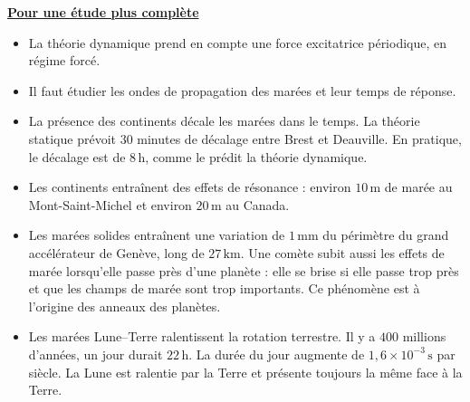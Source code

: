 \documentclass[11pt,a4paper]{article}
\newcommand{\titr}[1]{\par\textbf{\underline{#1}}\par\nopagebreak[3]}
\begin{document}
\titr{Pour une étude plus complète}
\begin{itemize}
\item La théorie dynamique prend en compte une force excitatrice périodique, en régime forcé.
\item Il faut étudier les ondes de propagation des marées et leur temps de réponse.
\item La présence des continents décale les marées dans le temps. La théorie statique prévoit $30$ minutes de décalage entre Brest et Deauville. En pratique, le décalage est de $8\,\mathrm h$, comme le prédit la théorie dynamique.
\item Les continents entraînent des effets de résonance : environ $10\,\mathrm m$ de marée au Mont-Saint-Michel et environ $20\,\mathrm m$ au Canada.
\item Les marées solides entraînent une variation de $1\,\mathrm{mm}$ du périmètre du grand accélérateur de Genève, long de $27\,\mathrm{km}$. Une comète subit aussi les effets de marée lorsqu'elle passe près d'une planète : elle se brise si elle passe trop près et que les champs de marée sont trop importants. Ce phénomène est à l'origine des anneaux des planètes.
\item Les marées Lune--Terre ralentissent la rotation terrestre. Il y a $400$ millions d'années, un jour durait $22\,\mathrm h$. La durée du jour augmente de $1{,}6\times10^{-3}\,\mathrm s$ par siècle.
La Lune est ralentie par la Terre et présente toujours la même face à la Terre.
\end{itemize}
\end{document}
